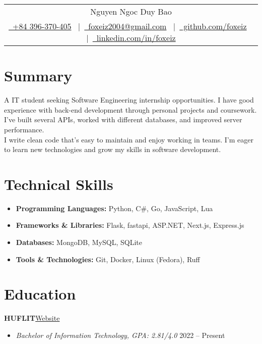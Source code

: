 \documentclass[a4paper,12pt]{article}
\newenvironment{itemList}[3][]
    {
    \noindent\hspace{1em}\textbf{#2}\hfill#3\\[3.75pt]
    \begin{minipage}[t]{\linewidth}
    \begin{itemize}[nosep,after=\strut, leftmargin=2em, itemsep=3pt, label={}, #1]
    }
    {
    \end{itemize}
    \end{minipage}
    }
\begin{document}
\pagestyle{empty}

\begin{tabularx}{\linewidth}{@{} C @{}}
    \Huge{Nguyen Ngoc Duy Bao} \\[7.5pt]
    \href{tel:+84396370405}{\raisebox{-0.05\height}\ +84 396-370-405} \ $|$\
    \href{mailto:foxeiz2004@gmail.com}{\raisebox{-0.05\height}\ foxeiz2004@gmail.com} \ $|$\
    \href{https://github.com/foxeiz}{\raisebox{-0.05\height}\ github.com/foxeiz} \ $|$\
    \href{https://linkedin.com/in/foxeiz}{\raisebox{-0.05\height}\ linkedin.com/in/foxeiz}
\end{tabularx}

\section{Summary}
A IT student seeking Software Engineering internship opportunities. I have good experience with back-end development through personal projects and coursework. I've built several APIs, worked with different databases, and improved server performance. \\[7.5pt]
I write clean code that's easy to maintain and enjoy working in teams. I'm eager to learn new technologies and grow my skills in software development.

\section{Technical Skills}
\begin{itemize}[nosep,after=\strut, leftmargin=1em, itemsep=4pt, label={}]
    \item \textbf{Programming Languages:} Python, C\#, Go, JavaScript, Lua
    \item \textbf{Frameworks \& Libraries:} Flask, fastapi, ASP.NET, Next.js, Express.js
    \item \textbf{Databases:} MongoDB, MySQL, SQLite
    \item \textbf{Tools \& Technologies:} Git, Docker, Linux (Fedora), Ruff
\end{itemize}

\section{Education}
\begin{itemList}{HUFLIT}{\href{https://huflit.edu.vn/}{Website}}
    \item \textit{Bachelor of Information Technology, GPA: 2.81/4.0} \hfill 2022 -- Present\hspace{-7.5pt}
\end{itemList}
\end{document}
